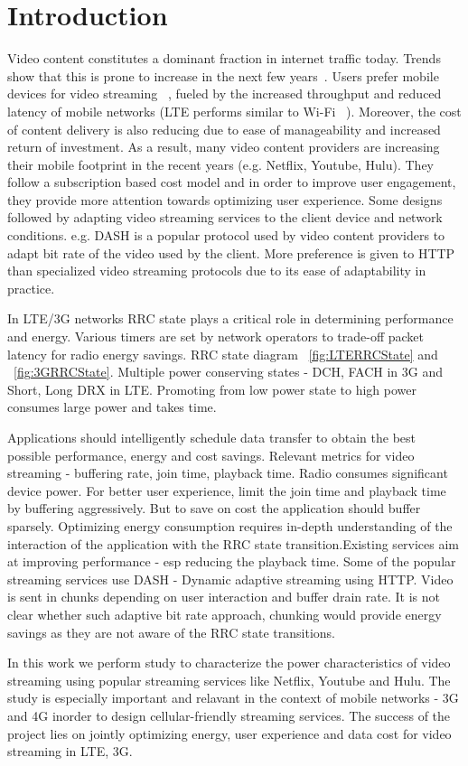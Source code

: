 \section{Introduction}
Video content constitutes a dominant fraction in internet traffic today. Trends show that this is prone to increase in the next few years~\cite{}.
Users prefer mobile devices for video streaming ~\cite{}, fueled by the increased throughput and reduced latency of mobile networks (LTE performs similar to Wi-Fi ~\cite{LTEPaper}).
Moreover, the cost of content delivery is also reducing due to ease of manageability and increased return of investment. As a result, many video content providers are increasing their mobile footprint in the recent years (e.g. Netflix, Youtube, Hulu). 
They follow a subscription based cost model and in order to improve user engagement, they provide more attention towards optimizing user experience. Some designs followed by adapting video streaming services to the client device and network conditions. e.g. DASH is a popular protocol used by video content providers to adapt bit rate of the video used by the client. 
More preference is given to HTTP than specialized video streaming protocols due to its ease of adaptability in practice.  
 
In LTE/3G networks RRC state plays a critical role in determining performance and energy. Various timers are set by network operators to trade-off packet latency for radio energy savings. RRC state diagram ~\ref{fig:LTERRCState} and ~\ref{fig:3GRRCState}. Multiple power conserving states - DCH, FACH in 3G and Short, Long DRX in LTE. Promoting from low power state to high power consumes large power and takes time.    

Applications should intelligently schedule data transfer to obtain the best possible performance, energy and cost savings. Relevant metrics for video streaming - buffering rate, join time, playback time. Radio consumes significant device power. For better user experience, limit the join time and playback time by buffering aggressively. But to save on cost the application should buffer sparsely. Optimizing energy consumption requires in-depth understanding of the interaction of the application with the RRC state transition.Existing services aim at improving performance - esp reducing the playback time. Some of the popular streaming services use DASH - Dynamic adaptive streaming using HTTP. Video is sent in chunks depending on user interaction and buffer drain rate. It is not clear whether such adaptive bit rate approach, chunking would provide energy savings as they are not aware of the RRC state transitions.           

In this work we perform study to characterize the power characteristics of video streaming using popular streaming services like Netflix, Youtube and Hulu. The study is especially important and relavant in the context of mobile networks - 3G and 4G inorder to design cellular-friendly streaming services. The success of the project lies on jointly optimizing energy, user experience and data cost for video streaming in LTE, 3G.      
